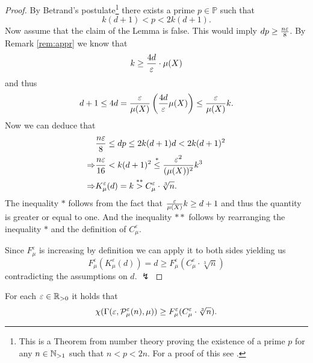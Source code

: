 \begin{proof}
  By Betrand's postulate\footnote{This is a Theorem from number theory proving the existence of a prime $p$ for any $n\in \N_{>1}$ such that $n < p < 2n$. For a proof of this see \cite{Chebyshev1852}.}
  there exists a prime $p \in \mathbb{P}$ such that \[k(d+1) < p < 2k(d+1).\]
  Now assume that the claim of the Lemma is false. This would imply $dp \geq {n\varepsilon \over 8}$. By Remark \ref{rem:appr} we know that \[k \geq {4d \over \varepsilon} \cdot \mu(X)\] and thus
  \begin{equation*}
    d+1 \leq 4d = {\varepsilon \over \mu(X)}\left({4d \over \varepsilon} \mu(X)\right)\leq {\varepsilon \over \mu(X)} k. 
  \end{equation*}
  Now we can deduce that
  \begin{align*}
    &{n\varepsilon \over 8} \leq dp \leq 2k(d+1)d < 2k(d+1)^2 \\
    \Rightarrow & {n\varepsilon \over 16} < k(d+1)^2 \overset{*}{\leq} {\varepsilon^2\over (\mu(X))^2}k^3 \\
    \Rightarrow & K_\mu^\varepsilon(d) = k \overset{**}{>} C_\mu^\varepsilon\cdot \sqrt[3]{n}.
  \end{align*}
  The inequality $*$ follows from the fact that ${\varepsilon \over \mu(X)}k \geq d+1$ and thus the quantity is greater or equal to one. And the inequality $**$ follows by rearranging the inequality $*$ and the definition of $C_\mu^\varepsilon$.

  Since $F_\mu^\varepsilon$ is increasing by definition we can apply it to both sides yielding us
  \begin{equation*}
    F_\mu^\varepsilon(K_\mu^\varepsilon(d)) = d \geq F_\mu^\varepsilon(C_\mu^\varepsilon\cdot\sqrt[3]{n})
  \end{equation*}
  contradicting the assumptions on $d$. $\lightning$
\end{proof}

\begin{thm}\label{thm:gammain}
  For each $\varepsilon \in \R_{>0}$ it holds that \[\chi(\Gamma(\varepsilon, \P^\varepsilon_\mu(n), \mu)) \geq F^\varepsilon_\mu(C^\varepsilon_\mu \cdot \sqrt[3]{n}).\]
\end{thm}

\newcommand{\h}{h_{m_q-1-q_0}}
\newcommand{\hh}{h_{m_q-q_0}}

